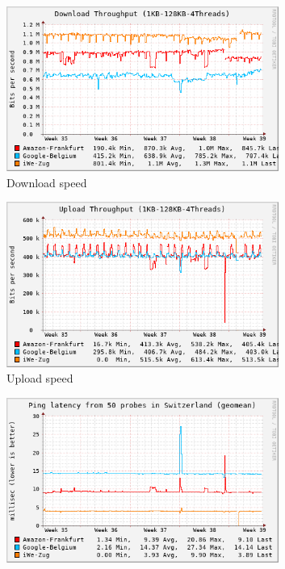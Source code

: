 \begin{figure}
\centering
\begin{subfigure}{.5\textwidth}
  \centering
  \includegraphics[width=0.98\textwidth]{30d-perf/download-month}
  \vspace{-0.05in}
  \caption{Download speed}
  \vspace{0.1in}
  \label{fig:sub1}
\end{subfigure}%
\begin{subfigure}{.5\textwidth}
  \centering
  \includegraphics[width=0.98\textwidth]{30d-perf/upload-month}
  \vspace{-0.05in}
  \caption{Upload speed}
  \vspace{0.1in}
  \label{fig:sub2}
\end{subfigure}
\begin{subfigure}{.5\textwidth}
  \centering
  \includegraphics[width=0.98\textwidth]{30d-perf/ping-month}

\end{subfigure}
\end{figure}

